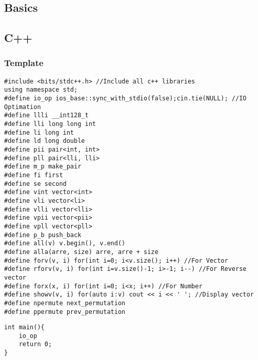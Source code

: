 \documentclass[twoside]{article}
\begin{document}
\begin{multicols*}{2}
    \tableofcontents
\end{multicols*}
\begin{multicols*}{2}
{
[\vspace{2em}]
\section*{Basics}
}
{
\subsection*{C++}
}
{
\subsubsection*{Template}
}
\begin{verbatim}
#include <bits/stdc++.h> //Include all c++ libraries
using namespace std;
#define io_op ios_base::sync_with_stdio(false);cin.tie(NULL); //IO Optimation
#define llli __int128_t
#define lli long long int
#define li long int
#define ld long double
#define pii pair<int, int>
#define pll pair<lli, lli>
#define m_p make_pair
#define fi first
#define se second
#define vint vector<int>
#define vli vector<li>
#define vlli vector<lli>
#define vpii vector<pii>
#define vpll vector<pll>
#define p_b push_back
#define all(v) v.begin(), v.end()
#define alla(arre, size) arre, arre + size
#define forv(v, i) for(int i=0; i<v.size(); i++) //For Vector
#define rforv(v, i) for(int i=v.size()-1; i>-1; i--) //For Reverse vector
#define forx(x, i) for(int i=0; i<x; i++) //For Number
#define showv(v, i) for(auto i:v) cout << i << ' '; //Display vector
#define npermute next_permutation
#define ppermute prev_permutation
\end{verbatim}
\vspace{-12pt}
\begin{verbatim}
int main(){
	io_op
	return 0;
}


\end{verbatim}
\end{multicols*}
\end{document}
